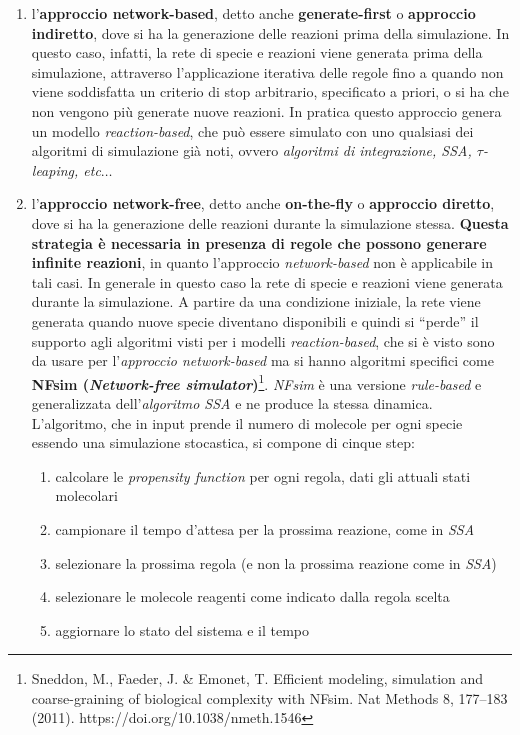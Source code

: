 \documentclass[a4paper,12pt, oneside]{book}
\begin{document}
\begin{enumerate}
  \item l'\textbf{approccio network-based}, detto anche \textbf{generate-first}
  o \textbf{approccio indiretto}, dove si ha la generazione delle reazioni prima
  della simulazione. In questo caso, infatti, la rete di specie e reazioni viene
  generata prima della simulazione, attraverso l'applicazione iterativa delle
  regole fino a quando non viene soddisfatta un criterio di stop
  arbitrario, specificato a priori, o si ha che non vengono più generate nuove
  reazioni. In pratica questo approccio genera un modello
  \textit{reaction-based}, che può essere simulato con uno qualsiasi dei
  algoritmi di simulazione già noti, ovvero \textit{algoritmi di integrazione,
    SSA, $\tau$-leaping, etc$\ldots$}  
  \item l'\textbf{approccio network-free}, detto anche \textbf{on-the-fly} o
  \textbf{approccio diretto}, dove si ha la generazione delle reazioni durante
  la simulazione stessa. \textbf{Questa strategia è necessaria in presenza di
    regole che 
    possono generare infinite reazioni}, in quanto l'approccio
  \textit{network-based} non è applicabile in tali casi. In generale in questo
  caso la rete di specie e reazioni viene generata durante la simulazione. A
  partire da una condizione iniziale, la rete viene generata quando nuove specie
  diventano disponibili e quindi si ``perde'' il supporto agli algoritmi visti
  per i modelli \textit{reaction-based}, che si è visto sono da usare per
  l'\textit{approccio network-based} ma si hanno algoritmi specifici come
  \textbf{NFsim (\textit{Network-free
      simulator})}\footnote{\label{nfsim}Sneddon, M., Faeder, 
    J. \& Emonet, T. Efficient modeling, simulation and coarse-graining of
    biological complexity with NFsim. Nat Methods 8, 177–183
    (2011). https://doi.org/10.1038/nmeth.1546}. \textit{NFsim} è una 
  versione \textit{rule-based} e generalizzata dell'\textit{algoritmo SSA} e ne
  produce la stessa dinamica. L'algoritmo, che in input prende il numero di
  molecole per ogni specie essendo una simulazione stocastica, si compone di
  cinque step: 
  \begin{enumerate}
    \item calcolare le \textit{propensity function} per ogni regola, dati gli
    attuali stati molecolari 
    \item campionare il tempo d'attesa per la prossima reazione, come in
    \textit{SSA}
    \item selezionare la prossima regola (e non la prossima reazione come in
    \textit{SSA}) 
    \item selezionare le molecole reagenti come indicato dalla regola scelta
    \item aggiornare lo stato del sistema e il tempo
  \end{enumerate}
\end{enumerate}
\end{document}
